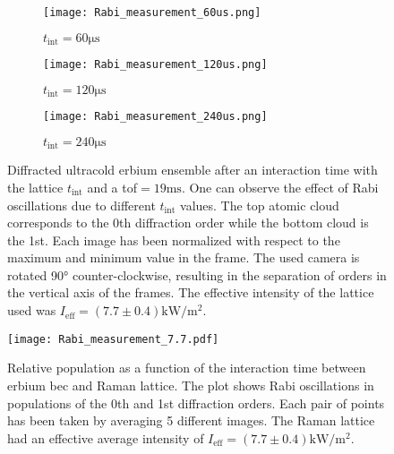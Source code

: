 \begin{figure}[!htbp]
	\centering
	\begin{subfigure}{.33\textwidth}
		\centering
		\texttt{[image: Rabi\_measurement\_60us.png]}
		\caption{ $t_\text{int} = 60\si{\micro\second}$}
		\label{fig:Bragg_images_1}
	\end{subfigure}%
	\begin{subfigure}{.33\textwidth}
		\centering
		\texttt{[image: Rabi\_measurement\_120us.png]}
		\caption{ $t_\text{int} = 120\si{\micro\second}$}
		\label{fig:Bragg_images_2}
	\end{subfigure}
	\begin{subfigure}{.33\textwidth}
		\centering
		\texttt{[image: Rabi\_measurement\_240us.png]}
		\caption{ $t_\text{int} = 240\si{\micro\second}$}
		\label{fig:Bragg_images_3}
	\end{subfigure}
	\caption[Diffracted ultracold erbium ensemble after an interaction time with the lattice $t_\text{int}$ and a \ac{tof}$=19\si{\milli\second}$]{Diffracted ultracold erbium ensemble after an interaction time with the lattice $t_\text{int}$ and a \ac{tof}$=19\si{\milli\second}$. One can observe the effect of Rabi oscillations due to different $t_\text{int}$ values. The top atomic cloud corresponds to the 0th diffraction order while the bottom cloud is the 1st. Each image has been normalized with respect to the maximum and minimum value in the frame. The used camera is rotated 90° counter-clockwise, resulting in the separation of orders in the vertical axis of the frames. The effective intensity of the lattice used was $I_\text{eff} = (7.7 \pm 0.4)\si{\kilo\watt\per\meter\squared}$.}
	\label{fig:Bragg_images}
\end{figure}

\begin{figure}[!htbp]\centering
	\texttt{[image: Rabi\_measurement\_7.7.pdf]}
	\caption[Relative population as a function of the interaction time between erbium \ac{bec} and Raman lattice]{Relative population as a function of the interaction time between erbium \ac{bec} and Raman lattice. The plot shows Rabi oscillations in populations of the 0th and 1st diffraction orders. Each pair of points has been taken by averaging 5 different images. The Raman lattice had an effective average intensity of $I_\text{eff} = (7.7 \pm 0.4)\si{\kilo\watt\per\meter\squared}$. }\label{fig:Bragg_measurement}
\end{figure}

